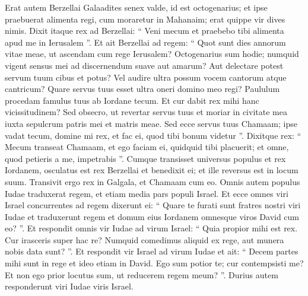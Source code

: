 \begin{biblechapter}
\begin{biblechapter}
\begin{biblechapter}
\begin{biblechapter}
\begin{biblechapter}
\begin{biblechapter}
\begin{biblechapter}
\begin{biblechapter}
\begin{biblechapter}
\begin{biblechapter}
\begin{biblechapter}
\begin{biblechapter}
\begin{biblechapter}
\begin{biblechapter}
\begin{biblechapter}
\begin{biblechapter}
\begin{biblechapter}
\begin{biblechapter}
\begin{biblechapter}
\verse Erat autem Berzellai Galaadites senex valde, id est octogenarius; et ipse praebuerat alimenta regi, cum moraretur in Mahanaim; erat quippe vir dives nimis. 
\verse Dixit itaque rex ad Berzellai: “ Veni mecum et praebebo tibi alimenta apud me in Ierusalem ”. 
\verse Et ait Berzellai ad regem: “ Quot sunt dies annorum vitae meae, ut ascendam cum rege Ierusalem? 
\verse Octogenarius sum hodie; numquid vigent sensus mei ad discernendum suave aut amarum? Aut delectare potest servum tuum cibus et potus? Vel audire ultra possum vocem cantorum atque cantricum? Quare servus tuus esset ultra oneri domino meo regi? 
\verse Paululum procedam famulus tuus ab Iordane tecum. Et cur dabit rex mihi hanc vicissitudinem? 
\verse Sed obsecro, ut revertar servus tuus et moriar in civitate mea iuxta sepulcrum patris mei et matris meae. Sed ecce servus tuus Chamaam; ipse vadat tecum, domine mi rex, et fac ei, quod tibi bonum videtur ”. 
\verse Dixitque rex: “ Mecum transeat Chamaam, et ego faciam ei, quidquid tibi placuerit; et omne, quod petieris a me, impetrabis ”. 
\verse Cumque transisset universus populus et rex Iordanem, osculatus est rex Berzellai et benedixit ei; et ille reversus est in locum suum.
 \verse Transivit ergo rex in Galgala, et Chamaam cum eo. Omnis autem populus Iudae traduxerat regem, et etiam media pars populi Israel. 
\verse Et ecce omnes viri Israel concurrentes ad regem dixerunt ei: “ Quare te furati sunt fratres nostri viri Iudae et traduxerunt regem et domum eius Iordanem omnesque viros David cum eo? ”. 
\verse Et respondit omnis vir Iudae ad virum Israel: “ Quia propior mihi est rex. Cur irasceris super hac re? Numquid comedimus aliquid ex rege, aut munera nobis data sunt? ”. 
\verse Et respondit vir Israel ad virum Iudae et ait: “ Decem partes mihi sunt in rege et ideo etiam in David. Ego sum potior te; cur contempsisti me? Et non ego prior locutus sum, ut reducerem regem meum? ”. Durius autem responderunt viri Iudae viris Israel.
 

\end{biblechapter}
\end{biblechapter}
\end{biblechapter}
\end{biblechapter}
\end{biblechapter}
\end{biblechapter}
\end{biblechapter}
\end{biblechapter}
\end{biblechapter}
\end{biblechapter}
\end{biblechapter}
\end{biblechapter}
\end{biblechapter}
\end{biblechapter}
\end{biblechapter}
\end{biblechapter}
\end{biblechapter}
\end{biblechapter}
\end{biblechapter}
